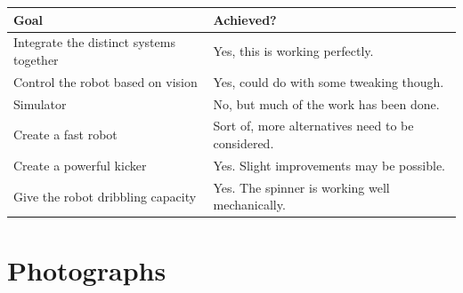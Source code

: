 \documentclass[12pt, a4paper, titlepage]{article}
\begin{document}
\begin{tabular}{| l | l |}
  \hline
  \textbf{Goal}                           & \textbf{Achieved?}                                \\
  \hline
  Integrate the distinct systems together & Yes, this is working perfectly.                   \\
  Control the robot based on vision       & Yes, could do with some tweaking though.          \\
  Simulator                               & No, but much of the work has been done.           \\
  Create a fast robot                     & Sort of, more alternatives need to be considered. \\
  Create a powerful kicker                & Yes. Slight improvements may be possible.         \\
  Give the robot dribbling capacity       & Yes. The spinner is working well mechanically.    \\
  \hline
\end{tabular}

\section{Photographs}
\end{document}
